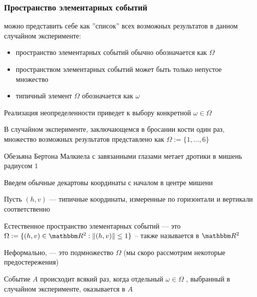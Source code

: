 \begin{frame}\frametitle{Пространство элементарных событий}

    \vspace{2em}
     можно представить себе как ''список'' всех возможных результатов в данном случайном эксперименте:     
    \begin{itemize}
        \item пространство элементарных событий обычно обозначается как $\Omega$
        \item пространством элементарных событий может быть только непустое множество
        \item типичный элемент $\Omega$ обозначается как $\omega$
   \end{itemize}
   
    \vspace{1em}
    Реализация неопределенности приведет к выбору конкретной $\omega\in \Omega$
    
\end{frame}


\begin{frame}

    \vspace{2em}
    \Eg
    В случайном эксперименте, заключающемся в бросании кости один раз, множество возможных результатов представлено как $\Omega := \{1,\ldots, 6\}$
    
    \vspace{1em}
    \Eg
    \label{eg:dart}
    Обезьяна Бертона Малкиела с завязанными глазами метает дротики в мишень радиусом $1$
    
    Введем обычные декартовы координаты с началом в центре мишени
    
    Пусть $(h, v)$ --- типичные координаты, измеренные по горизонтали и вертикали соответственно
    
    Естественное пространство элементарных событий --- это $\Omega :=
    \setntn{(h, v) \in \RR^2}{\| (h, v) \| \leq 1}$ -- также называется
     в $\RR^2$
    
\end{frame}

\begin{frame}

    \vspace{2em}
    Неформально,  --- это подмножество $\Omega$ 
    (мы скоро рассмотрим некоторые предостережения)
    
    \vspace{1em}
    Событие $A$
    происходит всякий раз, когда отдельный $\omega \in \Omega$ , выбранный в 
    случайном эксперименте, оказывается в $A$
    
\end{frame}

